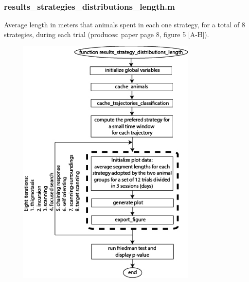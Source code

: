 \documentclass[12pt,titlepage]{article}
\begin{document}
\begin{doublespace}
\subsubsection{results\_strategies\_distributions\_length.m}
Average length in meters that animals spent in each one strategy, for a total of 8 strategies, during each trial (produces: paper page 8, figure 5 [A-H]).

\begin{figure}[H]
	\begin{center}
		\includegraphics[width=0.8\textwidth]{results_strategies_distributions_length.jpg}
		\label{fig5}
	\end{center}
\end{figure}


\end{doublespace}
\end{document}

